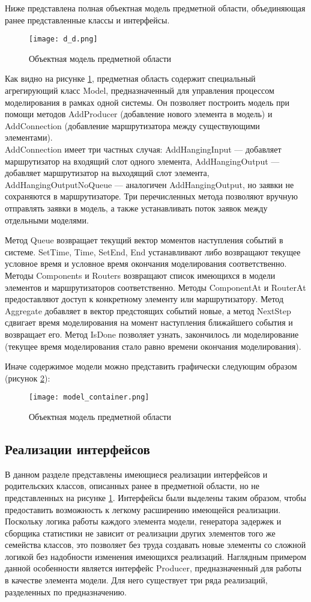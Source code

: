 Ниже представлена полная объектная модель предметной области, объединяющая ранее представленные классы и интерфейсы.
\begin{figure}[H]
	\centering
	\texttt{[image: d\_d.png]}
	\caption{Объектная модель предметной области}
	\label{d_d}
\end{figure}

Как видно на рисунке \ref{d_d}, предметная область содержит специальный агрегирующий класс Model, предназначенный для управления процессом моделирования в рамках одной системы. Он позволяет построить модель при помощи методов AddProducer (добавление нового элемента в модель) и AddConnection (добавление маршрутизатора между существующими элементами).\\
AddConnection имеет три частных случая: AddHangingInput --- добавляет маршрутизатор на входящий слот одного элемента, AddHangingOutput --- добавляет маршрутизатор на выходящий слот элемента, AddHangingOutputNoQueue --- аналогичен AddHangingOutput, но заявки не сохраняются в маршрутизаторе. Три перечисленных метода позволяют вручную отправлять заявки в модель, а также устанавливать поток заявок между отдельными моделями.

Метод Queue возвращает текущий вектор моментов наступления событий в системе. SetTime, Time, SetEnd, End устанавливают либо возвращают текущее условное время и условное время окончания моделирования соответственно. Методы Components и Routers возвращают список имеющихся в модели элементов и маршрутизаторов соответственно. Методы ComponentAt и RouterAt предоставляют доступ к конкретному элементу или маршрутизатору. Метод Aggregate добавляет в вектор предстоящих событий новые, а метод NextStep сдвигает время моделирования на момент наступления ближайшего события и возвращает его. Метод IsDone позволяет узнать, закончилось ли моделирование (текущее время моделирования стало равно времени окончания моделирования).

Иначе содержимое модели можно представить графически следующим образом (рисунок \ref{model_container}):
\begin{figure}[H]
	\centering
	\texttt{[image: model\_container.png]}
	\caption{Объектная модель предметной области}
	\label{model_container}
\end{figure}

\subsection{Реализации интерфейсов}
В данном разделе представлены имеющиеся реализации интерфейсов и родительских классов, описанных ранее в предметной области, но не представленных на рисунке \ref{d_d}. Интерфейсы были выделены таким образом, чтобы предоставить возможность к легкому расширению имеющейся реализации. Поскольку логика работы каждого элемента модели, генератора задержек и сборщика статистики не зависит от реализации других элементов того же семейства классов, это позволяет без труда создавать новые элементы со сложной логикой без надобности изменения имеющихся реализаций. Наглядным примером данной особенности является интерфейс Producer, предназначенный для работы в качестве элемента модели. Для него существует три ряда реализаций, разделенных по предназначению. 

